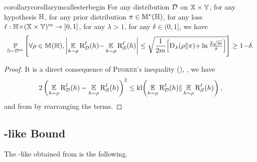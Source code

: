 \begin{noaddcontents}
\begin{restatable}{corollary}{corollarymcallesterbegin}
For any distribution $\mathcal{D}$ on $\mathbb{X}\times\mathbb{Y}$, for any hypothesis $\mathbb{H}$, for any prior distribution $\pi\in\mathbb{M}^{*}(\mathbb{H})$, for any loss $\ell: \mathbb{H}{\times}(\mathbb{X}\times\mathbb{Y})^m \to [0, 1]$, for any $\lambda>1$, for any $\delta\in(0, 1]$, we have
\begin{align*}
    \operatorname*{\mathbb{P}}_{\mathbb{S}\sim\mathcal{D}^m}\left[ \forall\rho\in\mathbb{M}(\mathbb{H}), \left\vert\operatorname*{\mathbb{E}}_{h\sim\rho}\text{R}^{\ell}_{\mathcal{D}}(h){-}\operatorname*{\mathbb{E}}_{h\sim\rho}\text{R}^{\ell}_{\mathcal{S}}(h)\right\vert \le \sqrt{\frac{1}{2m}\!\left[\operatorname{D}_{\lambda}(\rho\|\pi){+}\ln\tfrac{2\sqrt{m}}{\delta}\right]}\right] \ge 1{-}\delta.
\end{align*}
\label{ap:pac-bayes:corollary:mcallester-begin}
\end{restatable}
\begin{proof}
It is a direct consequence of \textsc{Pinsker}'s inequality (), \ie, we have
\begin{align*}
    2\left(\operatorname*{\mathbb{E}}_{h\sim\rho}\text{R}^{\ell}_{\mathcal{D}}(h)-\operatorname*{\mathbb{E}}_{h\sim\rho}\text{R}^{\ell}_{\mathcal{S}}(h)\right)^2 \le \operatorname{kl}\!\left(\operatorname*{\mathbb{E}}_{h\sim\rho}\text{R}^{\ell}_{\mathcal{D}}(h)\|\operatorname*{\mathbb{E}}_{h\sim\rho}\text{R}^{\ell}_{\mathcal{S}}(h)\right),
\end{align*}
and from  by rearranging the terms.
\end{proof}

\subsection{\citeauthor{Seeger2002}-like Bound}
\label{ap:pac-bayes:sec:proof-seeger-begin}

The \citeauthor{Seeger2002}-like obtained from  is the following.


\end{noaddcontents}
